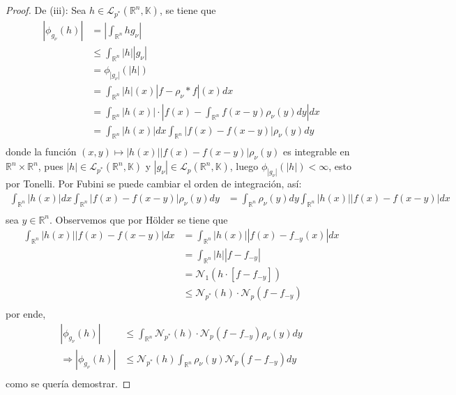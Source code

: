 \documentclass[12pt]{report}
\theoremstyle{largebreak}
\newcommand\abs[1]{\ensuremath{\left|#1\right|}}
\newcommand{\N}[2]{\ensuremath{\mathcal{N}_{#1}\left(#2\right)}}
\begin{document}
\begin{proof}
        De (iii): Sea $h\in\mathcal{L}_{p^*}(\mathbb{R}^n,\mathbb{K})$, se tiene que
        \begin{equation*}
            \begin{split}
                \abs{\phi_{ g_\nu}(h)}&=\abs{\int_{ \mathbb{R}^n}hg_\nu }\\
                &\leq\int_{ \mathbb{R}^n}\abs{h}\abs{g_\nu}\\
                &=\phi_{\abs{g_\nu}}(\abs{h})\\
                &=\int_{ \mathbb{R}^n}\abs{h}(x)\abs{f-\rho_\nu*f}(x)dx\\
                &=\int_{ \mathbb{R}^n}\abs{h(x)}\cdot\abs{f(x)-\int_{\mathbb{R}^n}f(x-y)\rho_\nu(y)dy}dx\\
                &=\int_{ \mathbb{R}^n}\abs{h(x)}dx\int_{\mathbb{R}^n}\abs{f(x)-f(x-y)}\rho_\nu(y)dy\\
            \end{split}
        \end{equation*}
        donde la función $(x,y)\mapsto\abs{h(x)}\abs{f(x)-f(x-y)}\rho_\nu(y)$ es integrable en $\mathbb{R}^n\times\mathbb{R}^n$, pues $\abs{h}\in\mathcal{L}_{ p^*}(\mathbb{R}^n,\mathbb{K})$ y $\abs{g_\nu}\in\mathcal{L}_{p}(\mathbb{R}^n,\mathbb{K})$, luego $\phi_{\abs{g_\nu}}(\abs{h})<\infty$, esto por Tonelli. Por Fubini se puede cambiar el orden de integración, así:
        \begin{equation*}
            \begin{split}
                \int_{ \mathbb{R}^n}\abs{h(x)}dx\int_{\mathbb{R}^n}\abs{f(x)-f(x-y)}\rho_\nu(y)dy&=\int_{ \mathbb{R}^n}\rho_\nu(y)dy\int_{\mathbb{R}^n}\abs{h(x)}\abs{f(x)-f(x-y)}dx \\
            \end{split}
        \end{equation*}
        sea $y\in\mathbb{R}^n$. Observemos que por Hölder se tiene que
        \begin{equation*}
            \begin{split}
                \int_{\mathbb{R}^n}\abs{h(x)}\abs{f(x)-f(x-y)}dx&=\int_{\mathbb{R}^n}\abs{h(x)}\abs{f(x)-f_{-y}(x)}dx\\
                &=\int_{\mathbb{R}^n}\abs{h}\abs{f-f_{-y}}\\
                &=\N{1}{h\cdot\left[f-f_{-y}\right]}\\
                &\leq\N{p^*}{h}\cdot\N{p}{f-f_{-y}}\\
            \end{split}
        \end{equation*}
        por ende,
        \begin{equation*}
            \begin{split}
                \abs{\phi_{ g_\nu}(h)}&\leq\int_{\mathbb{R}^n}\N{p^*}{h}\cdot\N{p}{f-f_{-y}}\rho_\nu(y)dy\\
                \Rightarrow\abs{\phi_{ g_\nu}(h)}&\leq\N{p^*}{h}\int_{\mathbb{R}^n}\rho_\nu(y)\N{p}{f-f_{-y}}dy\\
            \end{split}
        \end{equation*}
        como se quería demostrar.


\end{proof}
\end{document}
